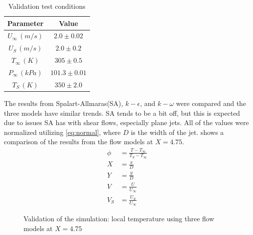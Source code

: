 \documentclass[preprint,12pt]{elsarticle}
\begin{document}
\begin{table}[!t!b!p]
\begin{center}
\begin{tabular}{ c c }
\hline
Parameter    & Value \\ \hline
$U_{\infty} \, (m/s)$ & $2.0\pm0.02$ \\
$U_S \, (m/s)$ & $2.0\pm0.2$ \\
$T_{\infty} \, (K) $ & $305\pm0.5$ \\
$P_{\infty} \, (kPa) $ & $101.3\pm0.01$ \\
$T_{S} \, (K) $ & $350\pm2.0$ \\ \hline
\end{tabular}
\caption{Validation test conditions}
\label{tab:VTjet}
\end{center}
\end{table}

The results from Spalart-Allmaras(SA), $k-\epsilon$, and $k-\omega$ were compared and the three models have similar trends.  SA tends to be a bit off, but this is expected due to issues SA has with shear flows, especially plane jets\cite{fluent}.  All of the values were normalized utilizing \cref{eq:normal}, where $D$ is the width of the jet.   shows a comparison of the results from the flow models at $X=4.75$.
\begin{subequations}
\begin{align}
\phi &= \frac{T-T_{\infty}}{T_S-T_{\infty}} \\
X &= \frac{x}{D} \\
Y &= \frac{y}{D} \\
V &= \frac{U}{U_\infty}  \\
V_S &= \frac{U_S}{U_{\infty}}
\end{align}
\label{eq:normal}
\end{subequations}
\begin{figure}[!tbp]
	\centering
  \setlength\figureheight{5cm} 
	\setlength\figurewidth{5cm}
	
	\caption{Validation of the simulation: local temperature using three flow models at $X=4.75$}
	\label{fig:jetmodel15mm}
\end{figure}
\end{document}
